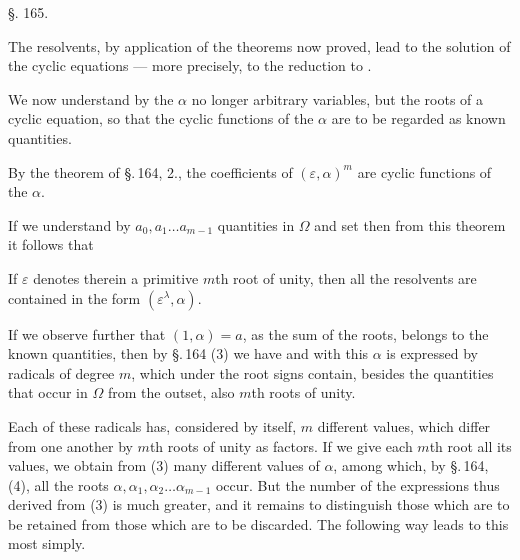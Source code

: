 
\begin{center}
§. 165.

\end{center}

The  resolvents, by application of the theorems now proved, lead to the solution of the cyclic equations — more precisely, to the reduction to .

We now understand by the $\alpha$ no longer arbitrary variables, but the roots of a cyclic equation, so that the cyclic functions of the $\alpha$ are to be regarded as known quantities.

By the theorem of \S.\,164, 2., the coefficients of $(\varepsilon,\alpha)^m$ are cyclic functions of the $\alpha$.

If we understand by $a_0, a_1\dots a_{m-1}$ quantities in $\Omega$ and set
then from this theorem it follows that

If $\varepsilon$ denotes therein a primitive $m$th root of unity, then all the resolvents are contained in the form $(\varepsilon^\lambda,\alpha)$.

If we observe further that $(1,\alpha) = a$, as the sum of the roots, belongs to the known quantities, then by \S.\,164 (3) we have
and with this $\alpha$ is expressed by radicals of degree $m$, which under the root signs contain, besides the quantities that occur in $\Omega$ from the outset, also $m$th roots of unity.

Each of these radicals has, considered by itself, $m$ different values, which differ from one another by $m$th roots of unity as factors. If we give each $m$th root all its values, we obtain from (3) many different values of $\alpha$, among which, by \S.\,164, (4), all the roots $\alpha, \alpha_1, \alpha_2\dots\alpha_{m-1}$ occur. But the number of the expressions thus derived from (3) is much greater, and it remains to distinguish those which are to be retained from those which are to be discarded. The following way leads to this most simply.
